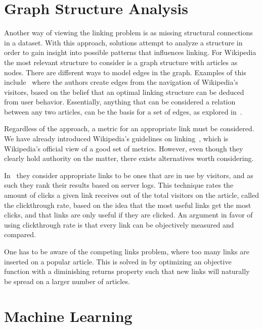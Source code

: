 \section{Graph Structure Analysis}\label{related_structural_analysis}
Another way of viewing the linking problem is as missing structural connections in a dataset. With this approach, solutions attempt to analyze a structure in order to gain insight into possible patterns that influences linking. For Wikipedia the most relevant structure to consider is a graph structure with articles as nodes. There are different ways to model edges in the graph. Examples of this include~\cite{hyperlink-structure-using-logs} where the authors create edges from the navigation of Wikipedia's visitors, based on the belief that an optimal linking structure can be deduced from user behavior. Essentially, anything that can be considered a relation between any two articles, can be the basis for a set of edges, as explored in~\cite{lu2011link}.

Regardless of the approach, a metric for an appropriate link must be considered. We have already introduced Wikipedia's guidelines on linking~\cite{wiki-editor-guidelines}, which is Wikipedia's official view of a good set of metrics. However, even though they clearly hold authority on the matter, there exists alternatives worth considering.

In~\cite{hyperlink-structure-using-logs} they consider appropriate links to be ones that are in use by visitors, and as such they rank their results based on server logs.  This technique rates the amount of clicks a given link receives out of the total visitors on the article, called the clickthrough rate, based on the idea that the most useful links get the most clicks, and that links are only useful if they are clicked. An argument in favor of using clickthrough rate is that every link can be objectively measured and compared. 

One has to be aware of the competing links problem, where too many links are inserted on a popular article. This is solved in \cite{hyperlink-structure-using-logs} by optimizing an objective function with a diminishing returns property such that new links will naturally be spread on a larger number of articles.

\section{Machine Learning}\label{related_machine_learning}

